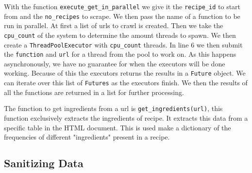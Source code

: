 \documentclass{article}
\begin{document}


With the function \texttt{execute\_get\_in\_parallel} we give it the \texttt{recipe\_id}
to start from and the \texttt{no\_recipes} to scrape. We then pass the name of a
function to be run in parallel. At first a list of urls to crawl is created. Then we take
the \texttt{cpu\_count} of the system to determine the amount threads to spawn. We then
create a \texttt{ThreadPoolExecutor} with \texttt{cpu\_count} threads. In line 6 we then
submit the \texttt{function} and \texttt{url} for a thread from the pool to work on. As
this happens asynchronously, we have no guarantee for when the executors will be done
working. Because of this the executors returns the results in a \texttt{Future} object. We
can iterate over this list of \texttt{Futures} as the executors finish. We then the
results of all the functions are returned in a list for further processing.

The function to get ingredients from a url is \texttt{get\_ingredients(url)}, this
function exclusively extracts the ingredients of recipe. It extracts this data from a
specific table in the HTML document. This is used make a dictionary of the frequencies of
different "ingredients" present in a recipe.

\subsection{Sanitizing Data}
\end{document}
